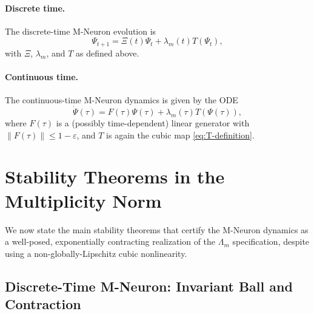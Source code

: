 \documentclass[11pt]{article}
\begin{document}
\paragraph{Discrete time.}
The discrete-time M-Neuron evolution is
\begin{equation}
\label{eq:discrete-evolution}
\Psi_{t+1}
= \Xi(t)\Psi_t + \lambda_m(t)T(\Psi_t),
\end{equation}
with \(\Xi\), \(\lambda_m\), and \(T\) as defined above.

\paragraph{Continuous time.}
The continuous-time M-Neuron dynamics is given by the ODE
\begin{equation}
\label{eq:continuous-evolution}
\dot{\Psi}(\tau)
= F(\tau)\Psi(\tau) + \lambda_m(\tau)T(\Psi(\tau)),
\end{equation}
where \(F(\tau)\) is a (possibly time-dependent) linear generator with \(\|F(\tau)\|\le 1-\varepsilon\), and \(T\) is again the cubic map \eqref{eq:T-definition}.

\section{Stability Theorems in the Multiplicity Norm}

We now state the main stability theorems that certify the M-Neuron dynamics as a well-posed, exponentially contracting realization of the \(\Lambda_m\) specification, despite using a non-globally-Lipschitz cubic nonlinearity.

\subsection{Discrete-Time M-Neuron: Invariant Ball and Contraction}
\end{document}
